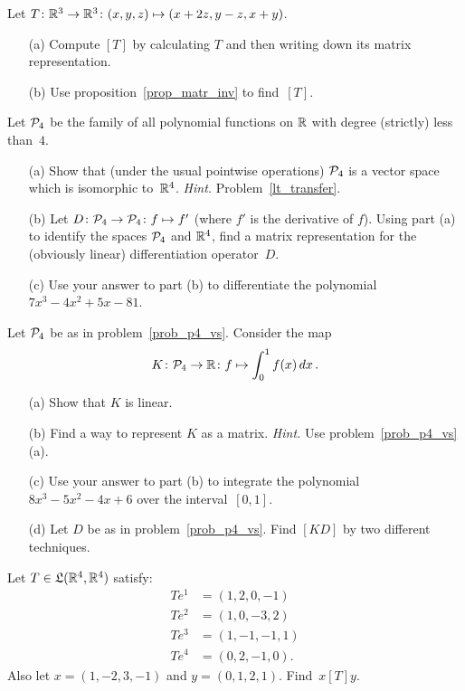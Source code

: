 \begin{prob} Let $T \colon \mathbb{R}^3 \rightarrow \mathbb{R}^3 \colon  (x,y,z) \mapsto (x + 2z, y - z, x + y)$.
 \begin{enumerate}
  \item[(a)] Compute $[T]$ by calculating $T$ and then writing down its matrix representation.
  \item[(b)] Use proposition~\ref{prop_matr_inv} to find~$[T]$.
 \end{enumerate}
\end{prob}

\begin{prob}\label{prob_p4_vs} Let $\mathcal{P}_4$ be the family of all polynomial functions on $\mathbb{R}$
with degree (strictly) less than~$4$.
 \begin{enumerate}
  \item[(a)] Show that (under the usual pointwise operations) $\mathcal{P}_4$ is a vector space which
is isomorphic to~$\mathbb{R}^4$. \emph{Hint.} Problem~\ref{lt_transfer}.
  \item[(b)] Let $D \colon \mathcal{P}_4 \rightarrow \mathcal{P}_4 \colon  f \mapsto f'$ (where $f'$ is the
derivative of $f$).  Using part (a) to identify the spaces $\mathcal{P}_4$ and $\mathbb{R}^4$, find a
matrix representation for the (obviously linear) differentiation operator~$D$.
  \item[(c)] Use your answer to part (b) to differentiate the polynomial $7x^3 - 4x^2 + 5x - 81$.
 \end{enumerate}
\end{prob}

\begin{prob} Let $\mathcal{P}_4$ be as in problem~\ref{prob_p4_vs}.  Consider the map
 \[ K \colon \mathcal{P}_4 \rightarrow \mathbb{R} \colon  f \mapsto \int_0^1 f(x)\,dx\,. \]
 \begin{enumerate}
  \item[(a)] Show that $K$ is linear.
  \item[(b)] Find a way to represent $K$ as a matrix. \emph{Hint.} Use problem~\ref{prob_p4_vs}(a).
  \item[(c)] Use your answer to part (b) to integrate the polynomial
$8x^3 - 5x^2 - 4x + 6$ over the interval~$[0,1]$.
  \item[(d)] Let $D$ be as in problem~\ref{prob_p4_vs}.  Find $[KD]$ by two different techniques.
 \end{enumerate}
\end{prob}

\begin{prob} Let $T \in \mathfrak{L}(\mathbb{R}^4,\mathbb{R}^4)$ satisfy:
 \begin{align*}
       Te^1 &= (1, 2, 0, -1) \\
       Te^2 &= (1, 0, -3, 2) \\
       Te^3 &= (1, -1,-1, 1) \\
       Te^4 &= (0, 2, -1, 0).
 \end{align*}
Also let $x = (1,-2,3,-1)$ and $y = (0,1,2,1)$.  Find~$x[T]y$.
\end{prob}
